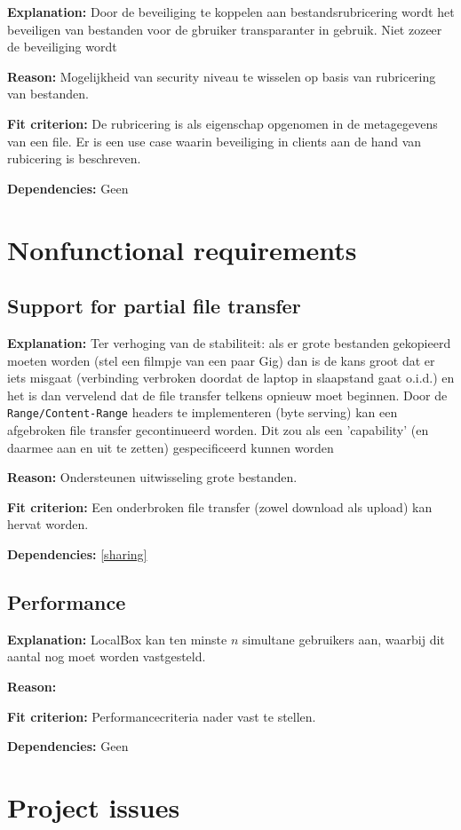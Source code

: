 \documentclass[[11pt,a4paper]{article}
\newcommand\requirement[2]{\subsection{#2}\label{#1}}
\newcommand\explanation{\noindent\textbf{Explanation: }}
\newcommand\reason{\noindent\textbf{Reason: }}
\newcommand\criterion{\noindent\textbf{Fit criterion: }}
\newcommand\dependencies{\noindent\textbf{Dependencies: }}
\begin{document}
    \explanation Door de beveiliging te koppelen aan bestandsrubricering wordt het beveiligen van bestanden voor de gbruiker transparanter in gebruik. Niet zozeer de beveiliging wordt 

    \reason Mogelijkheid van security niveau te wisselen op basis van rubricering van bestanden.

    \criterion De rubricering is als eigenschap opgenomen in de metagegevens van een file. Er is een use case waarin beveiliging in clients aan de hand van rubicering is beschreven.

    \dependencies Geen

\section{Nonfunctional requirements}

\requirement{partialtransfer}{Support for partial file transfer}

    \explanation Ter verhoging van de stabiliteit: als er grote bestanden gekopieerd moeten worden (stel een filmpje van een paar Gig) dan is de kans groot dat er iets misgaat (verbinding verbroken doordat de laptop in slaapstand gaat o.i.d.) en het is dan vervelend dat de file transfer telkens opnieuw moet beginnen. Door de \texttt{Range/Content-Range} headers te implementeren (byte serving) kan een afgebroken file transfer gecontinueerd worden. Dit zou als een 'capability' (en daarmee aan en uit te zetten) gespecificeerd kunnen worden

    \reason Ondersteunen uitwisseling grote bestanden.

    \criterion Een onderbroken file transfer (zowel download als upload) kan hervat worden.

    \dependencies \ref{sharing}

\requirement{performance}{Performance}

    \explanation LocalBox kan ten minste $n$ simultane gebruikers aan, waarbij dit aantal nog moet worden vastgesteld. 

    \reason 

    \criterion Performancecriteria nader vast te stellen.

    \dependencies Geen

\section{Project issues}
\end{document}
